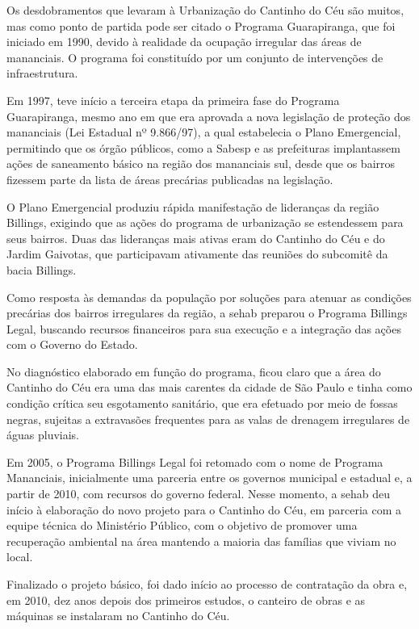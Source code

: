	Os desdobramentos que levaram à Urbanização do Cantinho do Céu são muitos, mas como ponto de partida pode ser citado o Programa Guarapiranga, que foi iniciado em 1990, devido à realidade da ocupação irregular das áreas de mananciais. O programa foi constituído por um conjunto de intervenções de infraestrutura.
	
	Em 1997, teve início a terceira etapa da primeira fase do Programa Guarapiranga, mesmo ano em que era aprovada a nova legislação de proteção dos mananciais (Lei Estadual nº 9.866/97), a qual estabelecia o Plano Emergencial, permitindo que os órgão públicos, como a Sabesp e as prefeituras implantassem ações de saneamento básico na região dos mananciais sul, desde que os bairros fizessem parte da lista de áreas precárias publicadas na legislação.
	
	O Plano Emergencial produziu rápida manifestação de lideranças da região Billings, exigindo que as ações do programa de urbanização se estendessem para seus bairros. Duas das lideranças mais ativas eram do Cantinho do Céu e do Jardim Gaivotas, que participavam ativamente das reuniões do subcomitê da bacia Billings.
	
	Como resposta às demandas da população por soluções para atenuar as condições precárias dos bairros irregulares da região, a \gls{sehab} preparou o Programa Billings Legal, buscando recursos financeiros para sua execução e a integração das ações com o Governo do Estado.
	
	No diagnóstico elaborado em função do programa, ficou claro que a área do Cantinho do Céu era uma das mais carentes da cidade de São Paulo e tinha como condição crítica seu esgotamento sanitário, que era efetuado por meio de fossas negras, sujeitas a extravasões frequentes para as valas de drenagem irregulares de águas pluviais.
	
	Em 2005, o Programa Billings Legal foi retomado com o nome de Programa Mananciais, inicialmente uma parceria entre os governos municipal e estadual e, a partir de 2010, com recursos do governo federal. Nesse momento, a \gls{sehab} deu início à elaboração do novo projeto para o Cantinho do Céu, em parceria com a equipe técnica do Ministério Público, com o objetivo de promover uma recuperação ambiental na área mantendo a maioria das famílias que viviam no local.
	
	Finalizado o projeto básico, foi dado início ao processo de contratação da obra e, em 2010, dez anos depois dos primeiros estudos, o canteiro de obras e as máquinas se instalaram no Cantinho do Céu. \cite{Barda2012}
	

